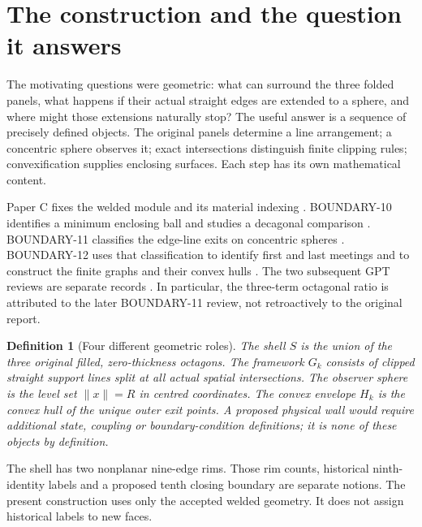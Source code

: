 \documentclass[11pt,a4paper]{article}
\newtheorem{definition}[theorem]{Definition}
\begin{document}
\section{The construction and the question it answers}\label{sec:intro}
The motivating questions were geometric: what can surround the three folded panels, what happens if their actual straight edges are extended to a sphere, and where might those extensions naturally stop? The useful answer is a sequence of precisely defined objects. The original panels determine a line arrangement; a concentric sphere observes it; exact intersections distinguish finite clipping rules; convexification supplies enclosing surfaces. Each step has its own mathematical content.

Paper C fixes the welded module and its material indexing \cite{PC}. BOUNDARY-10 identifies a minimum enclosing ball and studies a decagonal comparison \cite{B10}. BOUNDARY-11 classifies the edge-line exits on concentric spheres \cite{B11}. BOUNDARY-12 uses that classification to identify first and last meetings and to construct the finite graphs and their convex hulls \cite{B12}. The two subsequent GPT reviews are separate records \cite{G11,G12}. In particular, the three-term octagonal ratio is attributed to the later BOUNDARY-11 review, not retroactively to the original report.

\begin{definition}[Four different geometric roles]\label{def:roles}
The \emph{shell} $S$ is the union of the three original filled, zero-thickness octagons. The \emph{framework} $G_k$ consists of clipped straight support lines split at all actual spatial intersections. The \emph{observer sphere} is the level set $\|x\|=R$ in centred coordinates. The \emph{convex envelope} $H_k$ is the convex hull of the unique outer exit points. A proposed physical wall would require additional state, coupling or boundary-condition definitions; it is none of these objects by definition.
\end{definition}

The shell has two nonplanar nine-edge rims. Those rim counts, historical ninth-identity labels and a proposed tenth closing boundary are separate notions. The present construction uses only the accepted welded geometry. It does not assign historical labels to new faces.
\end{document}
